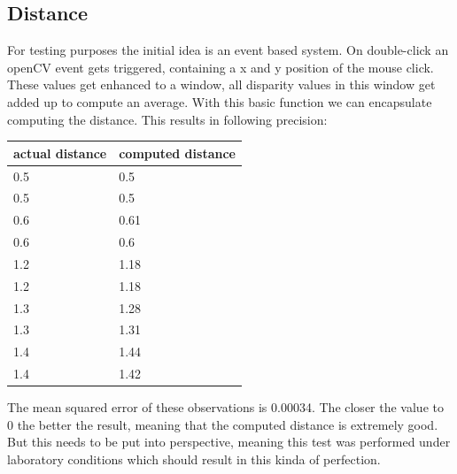 \documentclass[journal,onecolumn]{IEEEtran}
\begin{document}
\subsection{Distance}
\noindent
For testing purposes the initial idea is an event based system. On double-click an openCV event gets triggered, containing a x and y position of the mouse click. These values get enhanced to a window, all disparity values in this window get added up to compute an average. With this basic function we can encapsulate computing the distance. This results in following precision:
\begin{table}[H]
	\begin{tabular}{|l|l|}
		\hline
		actual distance & computed distance \\ \hline
		0.5             & 0.5               \\ \hline
		0.5             & 0.5               \\ \hline
		0.6             & 0.61              \\ \hline
		0.6             & 0.6               \\ \hline
		1.2             & 1.18              \\ \hline
		1.2             & 1.18              \\ \hline
		1.3             & 1.28              \\ \hline
		1.3             & 1.31              \\ \hline
		1.4             & 1.44              \\ \hline
		1.4             & 1.42              \\ \hline
	\end{tabular}
\end{table}
\noindent The mean squared error of these observations is 0.00034. The closer the value to 0 the better the result, meaning that the computed distance is extremely good. But this needs to be put into perspective, meaning this test was performed under laboratory conditions which should result in this kinda of perfection.
\end{document}
